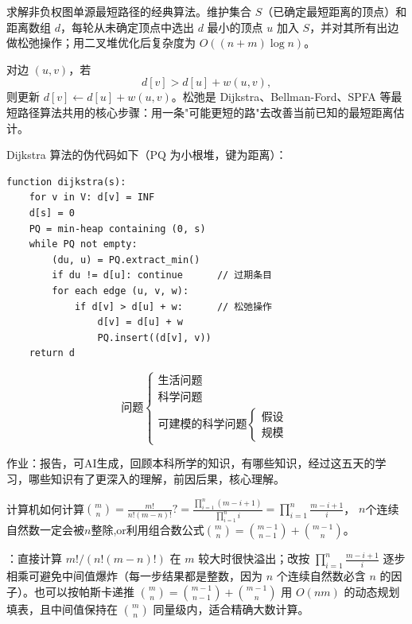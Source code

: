 \documentclass[12pt]{article}
\begin{document}
\begin{defn}[Dijkstra 算法]
  求解非负权图单源最短路径的经典算法。维护集合 $S$（已确定最短距离的顶点）和距离数组 $d$，每轮从未确定顶点中选出 $d$ 最小的顶点 $u$ 加入 $S$，并对其所有出边做松弛操作；用二叉堆优化后复杂度为 $O((n+m)\log n)$。
\end{defn}

\begin{defn}
  对边 $(u,v)$，若
  \[
    d[v] > d[u] + w(u,v),
  \]
  则更新 $d[v] \leftarrow d[u] + w(u,v)$。松弛是 Dijkstra、Bellman-Ford、SPFA 等最短路径算法共用的核心步骤：用一条"可能更短的路"去改善当前已知的最短距离估计。
\end{defn}

Dijkstra 算法的伪代码如下（$\mathrm{PQ}$ 为小根堆，键为距离）：
\begin{verbatim}
function dijkstra(s):
    for v in V: d[v] = INF
    d[s] = 0
    PQ = min-heap containing (0, s)
    while PQ not empty:
        (du, u) = PQ.extract_min()
        if du != d[u]: continue      // 过期条目
        for each edge (u, v, w):
            if d[v] > d[u] + w:      // 松弛操作
                d[v] = d[u] + w
                PQ.insert((d[v], v))
    return d
\end{verbatim}
\[
  \text{问题}\begin{cases}
    \text{生活问题} \\
    \text{科学问题} \\
    \text{可建模的科学问题}    \begin{cases}
                         \text{假设} \\
                         \text{规模}
                       \end{cases}
  \end{cases}
\]
\begin{note}
  作业：报告，可AI生成，回顾本科所学的知识，有哪些知识，经过这五天的学习，哪些知识有了更深入的理解，前因后果，核心理解。
\end{note}
\begin{exam}
  计算机如何计算$\binom{m}{n}=\frac{m!}{n!(m-n)!}?=\frac{\prod_{i=1}^{n} (m-i+1)}{\prod_{i=1}^{n} i}=\prod_{i=1}^{n} \frac{m-i+1}{i}$， $n$个连续自然数一定会被$n$整除,or利用组合数公式$\binom{m}{n}=\binom{m-1}{n-1}+\binom{m-1}{n}$。

  ：直接计算 $m!/(n!(m-n)!)$ 在 $m$ 较大时很快溢出；改按 $\prod_{i=1}^{n}\frac{m-i+1}{i}$ 逐步相乘可避免中间值爆炸（每一步结果都是整数，因为 $n$ 个连续自然数必含 $n$ 的因子）。也可以按帕斯卡递推 $\binom{m}{n}=\binom{m-1}{n-1}+\binom{m-1}{n}$ 用 $O(nm)$ 的动态规划填表，且中间值保持在 $\binom{m}{n}$ 同量级内，适合精确大数计算。

\end{exam}
\end{document}

